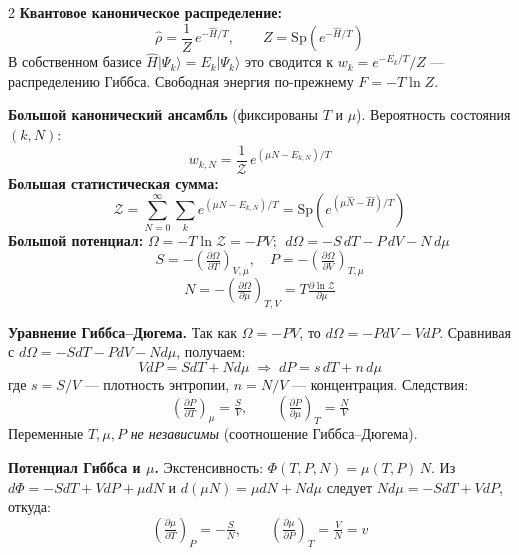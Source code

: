 \documentclass[a4paper,10pt]{article}
\begin{document}
\begin{multicols}{2}
\textbf{Квантовое каноническое распределение:}
\begin{equation*}
    \hat{\rho} = \frac{1}{Z}\,e^{-\hat{H}/T}, \qquad Z = \mathrm{Sp}\!\left(e^{-\hat{H}/T}\right)
\end{equation*}
В собственном базисе $\hat{H}|\Psi_k\rangle = E_k|\Psi_k\rangle$ это сводится к $w_k = e^{-E_k/T}/Z$ — распределению Гиббса. Свободная энергия по-прежнему $F = -T\ln Z$.

\textbf{Большой канонический ансамбль} (фиксированы $T$ и $\mu$). Вероятность состояния $(k, N)$:
\begin{equation*}
    w_{k,N} = \frac{1}{\mathcal{Z}}\,e^{(\mu N - E_{k,N})/T}
\end{equation*}
\textbf{Большая статистическая сумма:}
\begin{equation*}
    \mathcal{Z} = \sum_{N=0}^{\infty}\sum_k e^{(\mu N - E_{k,N})/T} = \mathrm{Sp}\!\left(e^{(\mu\hat{N}-\hat{H})/T}\right)
\end{equation*}
\textbf{Большой потенциал:} $\Omega = -T\ln\mathcal{Z} = -PV$; $\;d\Omega = -S\,dT - P\,dV - N\,d\mu$
\begin{equation*}
    S = -\!\left(\tfrac{\partial\Omega}{\partial T}\right)_{\!V,\mu},\quad
    P = -\!\left(\tfrac{\partial\Omega}{\partial V}\right)_{\!T,\mu}
\end{equation*}
\begin{equation*}
    N = -\!\left(\tfrac{\partial\Omega}{\partial\mu}\right)_{\!T,V} = T\tfrac{\partial\ln\mathcal{Z}}{\partial\mu}
\end{equation*}

\textbf{Уравнение Гиббса--Дюгема.} Так как $\Omega = -PV$, то $d\Omega = -PdV - VdP$. Сравнивая с $d\Omega = -SdT - PdV - Nd\mu$, получаем:
\begin{equation*}
    VdP = SdT + Nd\mu \;\Longrightarrow\; dP = s\,dT + n\,d\mu
\end{equation*}
где $s = S/V$ --- плотность энтропии, $n = N/V$ --- концентрация. Следствия:
\begin{equation*}
    \left(\tfrac{\partial P}{\partial T}\right)_{\!\mu} = \tfrac{S}{V}, \qquad
    \left(\tfrac{\partial P}{\partial \mu}\right)_{\!T} = \tfrac{N}{V}
\end{equation*}
Переменные $T, \mu, P$ \emph{не независимы} (соотношение Гиббса--Дюгема).

\textbf{Потенциал Гиббса и $\mu$.} Экстенсивность: $\Phi(T,P,N) = \mu(T,P)\,N$. Из $d\Phi = -SdT + VdP + \mu dN$ и $d(\mu N) = \mu dN + Nd\mu$ следует $Nd\mu = -SdT + VdP$, откуда:
\begin{equation*}
    \left(\tfrac{\partial\mu}{\partial T}\right)_{\!P} = -\tfrac{S}{N}, \qquad
    \left(\tfrac{\partial\mu}{\partial P}\right)_{\!T} = \tfrac{V}{N} = v
\end{equation*}


\end{multicols}
\end{document}
